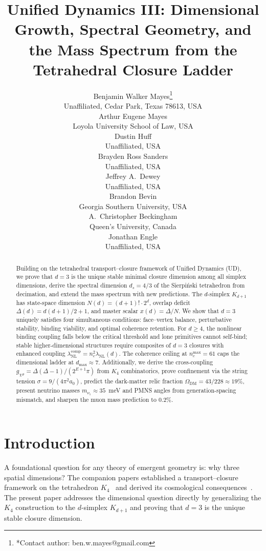 \documentclass[11pt,twocolumn]{article}
\title{Unified Dynamics III: Dimensional Growth, Spectral Geometry, and the Mass Spectrum from the Tetrahedral Closure Ladder}
\author{%
Benjamin Walker Mayes\thanks{*Contact author: ben.w.mayes@gmail.com}\\[4pt]
{\small Unaffiliated, Cedar Park, Texas 78613, USA}\\[8pt]
Arthur Eugene Mayes\\
{\small Loyola University School of Law, USA}\\[4pt]
Dustin Huff\\
{\small Unaffiliated, USA}\\[4pt]
Brayden Ross Sanders\\
{\small Unaffiliated, USA}\\[4pt]
Jeffrey A.\ Dewey\\
{\small Unaffiliated, USA}\\[4pt]
Brandon Bevin\\
{\small Georgia Southern University, USA}\\[4pt]
A.\ Christopher Beckingham\\
{\small Queen's University, Canada}\\[4pt]
Jonathan Engle\\
{\small Unaffiliated, USA}%
}
\date{}
\begin{document}
\maketitle

\begin{abstract}
Building on the tetrahedral transport--closure framework of Unified Dynamics (UD), we prove that $d=3$ is the unique stable minimal closure dimension among all simplex dimensions, derive the spectral dimension $d_s=4/3$ of the Sierpi\'nski tetrahedron from decimation, and extend the mass spectrum with new predictions.
The $d$-simplex $K_{d+1}$ has state-space dimension $N(d)=(d{+}1)!\cdot 2^d$, overlap deficit $\Delta(d)=d(d{+}1)/2{+}1$, and master scalar $x(d)=\Delta/N$.
We show that $d=3$ uniquely satisfies four simultaneous conditions: face--vertex balance, perturbative stability, binding viability, and optimal coherence retention.
For $d\geq 4$, the nonlinear binding coupling falls below the critical threshold and lone primitives cannot self-bind; stable higher-dimensional structures require composites of $d=3$ closures with enhanced coupling $\lambda_{\mathrm{NL}}^{\mathrm{comp}}=n_c^2\lambda_{\mathrm{NL}}(d)$.
The coherence ceiling at $n_c^{\max}=61$ caps the dimensional ladder at $d_{\max}\approx 7$.
Additionally, we derive the cross-coupling $g_{\chi\sigma}=\Delta(\Delta{-}1)/(2^{E+1}\pi)$ from $K_4$ combinatorics, prove confinement via the string tension $\sigma=9/(4\pi^2 a_0)$, predict the dark-matter relic fraction $\Omega_{\mathrm{DM}}=43/228\approx 19\%$, present neutrino masses $m_{\nu_1}\approx 35$~meV and PMNS angles from generation-spacing mismatch, and sharpen the muon mass prediction to $0.2\%$.
\end{abstract}

\section{Introduction}
\label{sec:intro}

A foundational question for any theory of emergent geometry is: why three spatial dimensions?
The companion papers established a transport--closure framework on the tetrahedron $K_4$~\cite{mayes2026ud} and derived its cosmological consequences~\cite{mayes2026cosmo}.
The present paper addresses the dimensional question directly by generalizing the $K_4$ construction to the $d$-simplex $K_{d+1}$ and proving that $d=3$ is the unique stable closure dimension.
\end{document}
